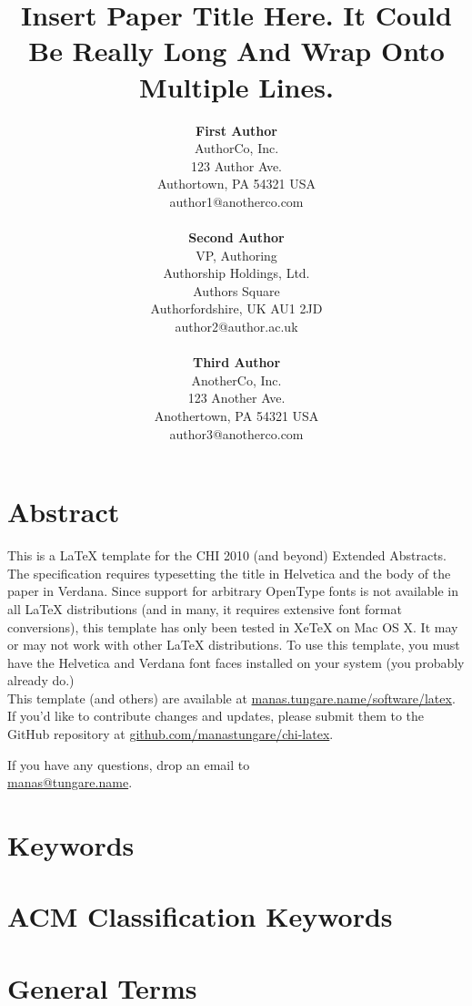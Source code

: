 \documentclass{chi-ext}
\title{Insert Paper Title Here. It Could Be Really Long And Wrap Onto Multiple Lines.}
\author{
  \textbf{First Author} \\
  AuthorCo, Inc. \\
  123 Author Ave. \\
  Authortown, PA 54321 USA \\
  author1@anotherco.com \\
  \\
  \textbf{Second Author} \\
  VP, Authoring \\
  Authorship Holdings, Ltd. \\
  Authors Square \\
  Authorfordshire, UK AU1 2JD \\
  author2@author.ac.uk \\
  \\
  \textbf{Third Author} \\
  AnotherCo, Inc. \\
  123 Another Ave. \\
  Anothertown, PA 54321 USA \\
  author3@anotherco.com \\
}
\begin{document}
\maketitle

\begin{multicols}{2}

\makeauthors
\makecopyright

\section{Abstract}

This is a LaTeX template for the CHI 2010 (and beyond) Extended Abstracts. The specification
requires typesetting the title in Helvetica and the body of the paper in Verdana. Since support for
arbitrary OpenType fonts is not available in all LaTeX distributions (and in many, it requires
extensive font format conversions), this template has only been tested in XeTeX on Mac OS X. It may
or may not work with other LaTeX distributions. To use this template, you must have the Helvetica
and Verdana font faces installed on your system (you probably already do.)
\\

This template (and others) are available at
\href{http://manas.tungare.name/software/latex}{manas.tungare.name/software/latex}.
If you'd like to contribute changes and updates, please submit them to the GitHub repository at
\href{https://github.com/manastungare/chi-latex}{github.com/manastungare/chi-latex}.

If you have any questions, drop an email to \\
\href{mailto:manas@tungare.name}{manas@tungare.name}.

\section{Keywords}
\makeatletter \@keywords \makeatother

\section{ACM Classification Keywords}
\makeatletter \@acmclassification \makeatother

\section{General Terms}
\makeatletter \@generalterms \makeatother



\end{multicols}
\end{document}
